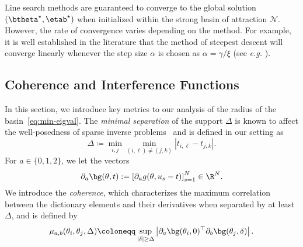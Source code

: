 \documentclass[conference,english,final,svgnames]{IEEEtran}
\begin{document}
Line search methods are guaranteed to converge to the global solution $(\btheta^\star, \etab^\star)$ when initialized within the strong basin of attraction $\mathcal{N}$. However, the rate of convergence varies depending on the method. For example, it is well established in the literature that the method of steepest descent will converge linearly whenever the step size $\alpha$ is chosen as $\alpha = \gamma/\xi$ (see \emph{e.g.} \cite[Theorem 2.1]{Nocedal2006}).

\subsection{Coherence and Interference Functions}
\label{sec:coherence}

In this section, we introduce key metrics to our analysis of the radius of the basin~\eqref{eq:min-eigval}. The \emph{minimal separation} of the support $\Delta$ is known to affect the well-posedness of sparse inverse problems~\cite{ferreira2020stable, hockmann2023weak} and is defined in our setting as
\begin{equation}
    \Delta \coloneqq \min_{i,j} \min_{(i,\ell) \neq (j,k)} |t_{i,\ell} - t_{j,k}|.
\end{equation}
For $a \in \{0,1,2\}$, we let the vectors
\begin{equation}
    \partial_a \bg(\theta, t) := \left[ \partial_a g(\theta, u_s - t) \right]_{s=1}^N \in \R^N.
\end{equation}
We introduce the \emph{coherence}, which characterizes the maximum correlation between the dictionary elements and their derivatives when separated by at least $\Delta$, and is defined by
\begin{equation}\label{eq:def_coherence}
    \mu_{a,b}(\theta_i, \theta_j, \Delta) 
    \coloneqq \sup_{|\delta|\geq \Delta} \left| \partial_a \bg(\theta_i, 0)^{\top} \partial_b \bg(\theta_j, \delta)  \right|.
\end{equation}
\end{document}

